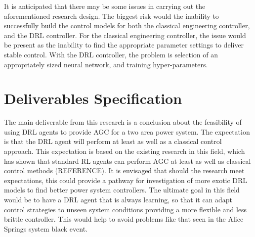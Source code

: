 \documentclass[12pt, a4paper]{article}
\begin{document}
It is anticipated that there may be some issues in carrying out the aforementioned research design. The biggest risk would the inability to successfully build the control models for both the classical engineering controller, and the DRL controller. For the classical engineering controller, the issue would be present as the inability to find the appropriate parameter settings to deliver stable control. With the DRL controller, the problem is selection of an appropriately sized neural network, and training hyper-parameters.


\section{Deliverables Specification}
The main deliverable from this research is a conclusion about the feasibility of using DRL agents to provide AGC for a two area power system. The expectation is that the DRL agent will perform at least as well as a classical control approach. This expectation is based on the existing research in this field, which has shown that standard RL agents can perform AGC at least as well as classical control methods (REFERENCE). It is envisaged that should the research meet expectations, this could provide a pathway for investigation of more exotic DRL models to find better power system controllers. The ultimate goal in this field would be to have a DRL agent that is always learning, so that it can adapt control strategies to unseen system conditions providing a more flexible and less brittle controller. This would help to avoid problems like that seen in the Alice Springs system black event.\\

\clearpage

\end{document}
